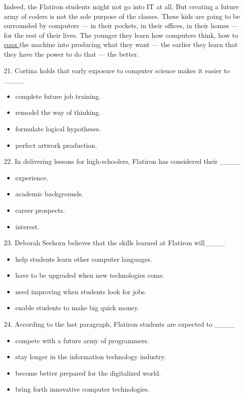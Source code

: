 \documentclass[UTF8,11pt]{ctexart}
\begin{document}
Indeed, the Flatiron students might not go into IT at all. But creating a future army of coders is not the sole purpose of the classes. These kids are going to be surrounded by computers — in their pockets, in their offices, in their homes — for the rest of their lives. The younger they learn how computers think, how to \uline{coax }the machine into producing what they want — the earlier they learn that they have the power to do that — the better.


21. Cortina holds that early exposure to computer science makes it easier to \_\_\_\_


\begin{itemize}[leftmargin=2em,itemsep=.2em,topsep=.4em]\item[A.] complete future job training.
\item[B.] remodel the way of thinking.
\item[C.] formulate logical hypotheses.
\item[D.] perfect artwork production.
\end{itemize}

22. In delivering lessons for high-schoolers, Flatiron has considered their \_\_\_\_


\begin{itemize}[leftmargin=2em,itemsep=.2em,topsep=.4em]\item[A.] experience.
\item[B.] academic backgrounds.
\item[C.] career prospects.
\item[D.] interest.
\end{itemize}

23. Deborah Seehorn believes that the skills learned at Flatiron will\_\_\_\_


\begin{itemize}[leftmargin=2em,itemsep=.2em,topsep=.4em]\item[A.] help students learn other computer languages.
\item[B.] have to be upgraded when new technologies come.
\item[C.] need improving when students look for jobs.
\item[D.] enable students to make big quick money.
\end{itemize}

24. According to the last paragraph, Flatiron students are expected to \_\_\_\_


\begin{itemize}[leftmargin=2em,itemsep=.2em,topsep=.4em]\item[A.] compete with a future army of programmers.
\item[B.] stay longer in the information technology industry.
\item[C.] become better prepared for the digitalized world.
\item[D.] bring forth innovative computer technologies.
\end{itemize}
\end{document}
